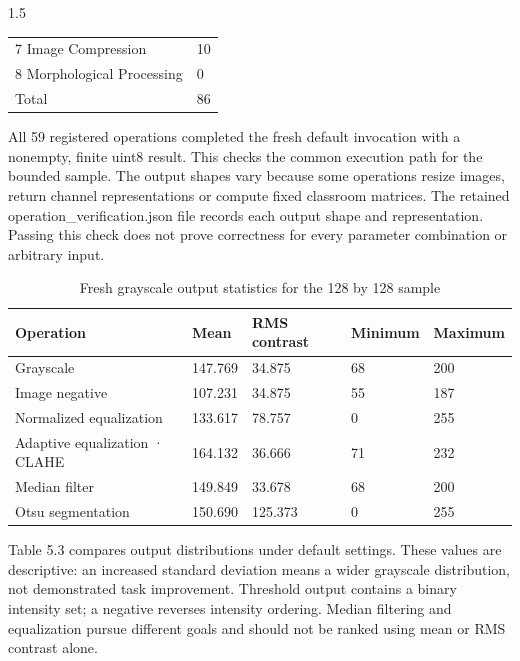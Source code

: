 \begin{spacing}{1.5}
\begin{table}[htbp]
\begin{tabularx}{\textwidth}{XX}
7 Image Compression & 10\\
8 Morphological Processing & 0\\
Total & 86\\
\bottomrule\end{tabularx}\end{table}
All 59 registered operations completed the fresh default invocation with a nonempty, finite uint8 result. This checks the common execution path for the bounded sample. The output shapes vary because some operations resize images, return channel representations or compute fixed classroom matrices. The retained operation\_verification.json file records each output shape and representation. Passing this check does not prove correctness for every parameter combination or arbitrary input.

\begin{table}[htbp]\centering\small
\caption{Fresh grayscale output statistics for the 128 by 128 sample}
\begin{tabularx}{\textwidth}{XXXXX}
\toprule
\textbf{Operation} & \textbf{Mean} & \textbf{RMS contrast} & \textbf{Minimum} & \textbf{Maximum}\\\midrule
Grayscale & 147.769 & 34.875 & 68 & 200\\
Image negative & 107.231 & 34.875 & 55 & 187\\
Normalized equalization & 133.617 & 78.757 & 0 & 255\\
Adaptive equalization · CLAHE & 164.132 & 36.666 & 71 & 232\\
Median filter & 149.849 & 33.678 & 68 & 200\\
Otsu segmentation & 150.690 & 125.373 & 0 & 255\\
\bottomrule\end{tabularx}\end{table}
Table 5.3 compares output distributions under default settings. These values are descriptive: an increased standard deviation means a wider grayscale distribution, not demonstrated task improvement. Threshold output contains a binary intensity set; a negative reverses intensity ordering. Median filtering and equalization pursue different goals and should not be ranked using mean or RMS contrast alone.


\end{spacing}
